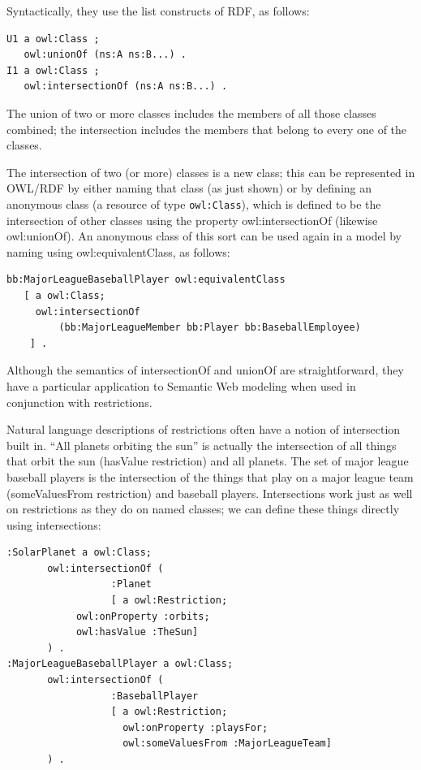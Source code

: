 Syntactically, they use the list constructs of RDF, as follows:

\begin{lstlisting}
U1 a owl:Class ;
   owl:unionOf (ns:A ns:B...) .
I1 a owl:Class ;
   owl:intersectionOf (ns:A ns:B...) .
\end{lstlisting}

The union of two or more classes includes the members of all those
classes combined; the intersection includes the members that belong to
every one of the classes.

The intersection of two (or more) classes is a new class; this can be
represented in OWL/RDF by either naming that class (as just shown) or by
defining an anonymous class (a resource of type \texttt{owl:Class}), which is
defined to be the intersection of other classes using the property
owl:intersectionOf (likewise owl:unionOf). An anonymous class of this
sort can be used again in a model by naming using owl:equivalentClass,
as follows:

\begin{lstlisting}
bb:MajorLeagueBaseballPlayer owl:equivalentClass
   [ a owl:Class;
     owl:intersectionOf
         (bb:MajorLeagueMember bb:Player bb:BaseballEmployee)
    ] .
\end{lstlisting}

Although the semantics of intersectionOf and unionOf are
straightforward, they have a particular application to Semantic Web
modeling when used in conjunction with restrictions.

Natural language descriptions of restrictions often have a notion of
intersection built in. ``All planets orbiting the sun'' is actually the
intersection of all things that orbit the sun (hasValue restriction) and
all planets. The set of major league baseball players is the
intersection of the things that play on a major league team
(someValuesFrom restriction) and baseball players. Intersections work
just as well on restrictions as they do on named classes; we can define
these things directly using intersections:

\begin{lstlisting}
:SolarPlanet a owl:Class;
       owl:intersectionOf (
                  :Planet
                  [ a owl:Restriction; 
		    owl:onProperty :orbits;
		    owl:hasValue :TheSun]
       ) .
:MajorLeagueBaseballPlayer a owl:Class;
       owl:intersectionOf (
                  :BaseballPlayer
                  [ a owl:Restriction;
                    owl:onProperty :playsFor; 
                    owl:someValuesFrom :MajorLeagueTeam] 
       ) .
\end{lstlisting}


